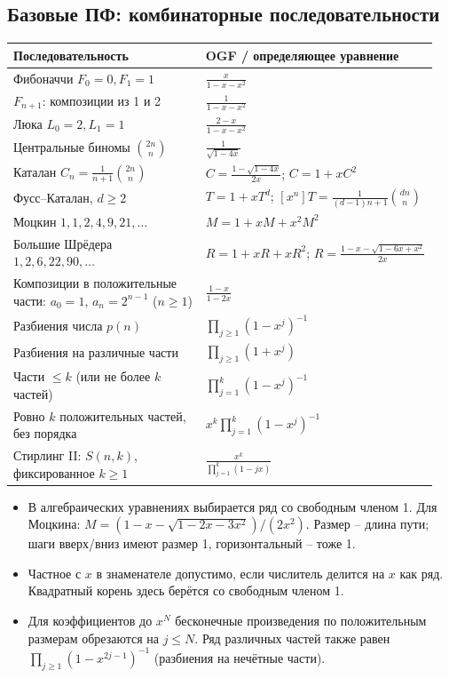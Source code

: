 \subsection{Базовые ПФ: комбинаторные последовательности}
{\renewcommand{\arraystretch}{1.75}\setlength{\tabcolsep}{3pt}
\begin{tabular}{@{}p{0.43\linewidth}p{0.52\linewidth}@{}}
\textbf{Последовательность} & \textbf{OGF / определяющее уравнение}\\\hline
Фибоначчи $F_0=0,F_1=1$ & $\frac{x}{1-x-x^2}$\\
$F_{n+1}$: композиции из 1 и 2 & $\frac1{1-x-x^2}$\\
Люка $L_0=2,L_1=1$ & $\frac{2-x}{1-x-x^2}$\\
Центральные биномы $\binom{2n}n$ & $\frac1{\sqrt{1-4x}}$\\
Каталан $C_n=\frac1{n+1}\binom{2n}n$ & $C=\frac{1-\sqrt{1-4x}}{2x}$; $C=1+xC^2$\\
Фусс--Каталан, $d\ge2$ & $T=1+xT^d$; $[x^n]T=\frac1{(d-1)n+1}\binom{dn}n$\\
Моцкин $1,1,2,4,9,21,\ldots$ & $M=1+xM+x^2M^2$\\
Большие Шрёдера $1,2,6,22,90,\ldots$ & $R=1+xR+xR^2$; $R=\frac{1-x-\sqrt{1-6x+x^2}}{2x}$\\
Композиции в положительные части: $a_0=1$, $a_n=2^{n-1}$ ($n\ge1$) & $\frac{1-x}{1-2x}$\\
Разбиения числа $p(n)$ & $\prod_{j\ge1}(1-x^j)^{-1}$\\
Разбиения на различные части & $\prod_{j\ge1}(1+x^j)$\\
Части $\le k$ (или не более $k$ частей) & $\prod_{j=1}^k(1-x^j)^{-1}$\\
Ровно $k$ положительных частей, без порядка & $x^k\prod_{j=1}^k(1-x^j)^{-1}$\\
Стирлинг II: $S(n,k)$, фиксированное $k\ge1$ & $\frac{x^k}{\prod_{j=1}^k(1-jx)}$\\
\end{tabular}}
\begin{itemize}[leftmargin=*, nosep]
\item В алгебраических уравнениях выбирается ряд со свободным членом 1. Для Моцкина: $M=(1-x-\sqrt{1-2x-3x^2})/(2x^2)$. Размер -- длина пути; шаги вверх/вниз имеют размер 1, горизонтальный -- тоже 1.
\item Частное с $x$ в знаменателе допустимо, если числитель делится на $x$ как ряд. Квадратный корень здесь берётся со свободным членом 1.
\item Для коэффициентов до $x^N$ бесконечные произведения по положительным размерам обрезаются на $j\le N$. Ряд различных частей также равен $\prod_{j\ge1}(1-x^{2j-1})^{-1}$ (разбиения на нечётные части).
\end{itemize}

